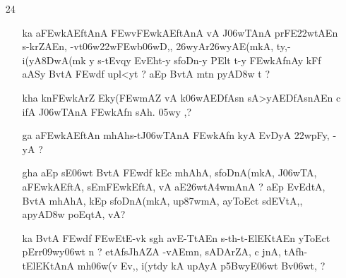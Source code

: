 \def\DevnagVersion{2.15}\documentclass{article}
\begin{document}
\begin{itemize}
\begin{itemize}
          \item[\dn cha] {\dn s\2-tEv\38DwAEvqy\? y\? EvEvDA, s\2foDnA(mkA, up\387wmA, \3FEwv\3ECwy\306wt\?{\rs ,\re} t\?qA\2 s\2DAnAy Ek\2 Ev D\2 sADnt\306w/\2 Bv\3D7w, f\2s\?, {\rs ?\re}}
          
          \item[\dn ja] {\dn Bv(\3FEwd\?f\? s\2-tmhAEv\38DwAly\? pAWfAlA c s\2foDnAT\0 aE-t ko{\rs ???\re}Ep avkAf, sADnsAmEJ vA {\rs ?\re} yEd vA a apyA\0\3D8wA -yA kA upAyA tE\392wqy\? Bv\306wt, EnEd\0f\?, {\rs ?\re} }
          
         \end{itemize}


\item[24] \begin{itemize}
           
          \item[\dn ka] {\dn a\3FEwkAEftAnA\2 \3FEwv\3FEwkAEftAnA\2 vA J\306wTAnA\2 prFE\322wtAEn s\2-krZAEn{\rs ,\re} -vt\306w\322w\3FEwb\306wD,{\rs ,\re} \326wyAr\326wyAE(mkA, ty,{\rs -\re}i(yA\38DwA(mk\2 y s\2-tEvqy\? EvEht-y s\2foDn-y PElt t-y \3FEwkAfnAy kFf aASy\2 BvtA\2 \3FEwd\?f\? upl<yt\? {\rs ?\re} aEp BvtA\2 mt\?n pyA\0\3D8w\2 t {\rs ?\re}} 
           
          \item[\dn kha] {\dn k\?n\3FEwkAr\?Z Eky(\3FEwmAZ\2 vA k\?\306wAEDfAsn\2 sA>yAEDfAsnAEn c ifA\2 J\306wTAnA\2 \3FEwkAfn\? sAh. \305wy\2 \0,{\rs ?\re}} 
          
          \item[\dn ga] {\dn a\3FEwkAEftAn\2 mhAh\0s\2-tJ\306wTAnA\2 \3FEwkAfn\2 kyA EvDyA\2 \322w\?pFy, -yA {\rs ?\re} }
          
          \item[\dn gha] {\dn aEp sE\306wt BvtA\2 \3FEwd\?f\? k\?Ec mhAhA\0, s\2foDnA(mkA, J\306wTA, a\3FEwkAEftA, sEm\3FEwkEftA, vA aE\326wt\3A4wmAnA\2 {\rs ?\re} aEp EvEdtA, BvtA\2 mhAhA\0, kEp s\2foDnA(mkA, up\387wmA, ayToEct\2 s\2dEVtA,{\rs ,\re} apyA\0\3D8w\2 poEqtA, vA{\rs ?\re}}
          \end{itemize}

\item[\dn 24] \begin{itemize}
               
               \item[\dn ka] {\dn BvtA\2 \3FEwd\?f\? \3FEwEtE-vk\? s\2g\5h\? avE-TtAEn s\2-th-t{\rs -\re}ElEKtAEn yToEct\2 pErr\309wy\306wt\? n {\rs ?\re} etAfs\2JhAZA\2 -vAEmn, sADArZA, c jnA, tAfh-tElEKtAnA\2 mh\306w(v\2 Ev,{\rs ,\re} i(y\?tdy\?{\qvb} kA upAyA p\35BwyE\306wt Bv\306wt, {\rs ?\re}}
               

\end{itemize}
\end{itemize}
\end{document}
